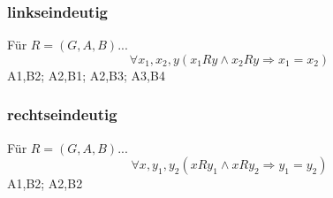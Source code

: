 \subsubsection{linkseindeutig}
Für  $R = (G,A,B)$...
    \begin{equation}
        \forall{x_1,x_2,y}(x_1Ry \wedge x_2Ry \Rightarrow x_1 = x_2)
    \end{equation}
    {
    A1,B2;
    A2,B1;
    A2,B3;
    A3,B4
    }
\linkseindeutig{}
\subsubsection{rechtseindeutig}
Für  $R = (G,A,B)$...
    \begin{equation}
        \forall{x,y_1,y_2}(xRy_1 \wedge xRy_2 \Rightarrow y_1 = y_2)
    \end{equation}
        {
        A1,B2;
        A2,B2
        }
    \rechtseindeutig{}
